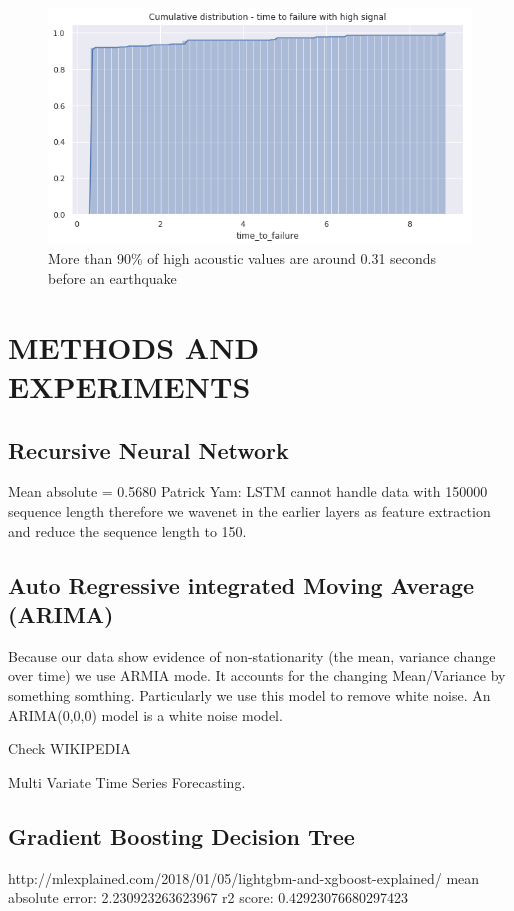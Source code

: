 \documentclass[]{llncs}
\begin{document}
\begin{figure}
	\centering
	\includegraphics[width=0.7\linewidth]{../GPUProject/moreThan90percent}
	\caption{More than 90\% of high acoustic values are around 0.31 seconds before an earthquake}
		\label{fig:morethan90percent}
	\end{figure}






\section{METHODS AND EXPERIMENTS}

\subsection{Recursive Neural Network}
Mean absolute = 0.5680
Patrick Yam: LSTM cannot handle data with 150000 sequence length therefore we wavenet in the earlier layers as feature extraction and reduce the sequence length to 150.\par

\subsection{Auto Regressive integrated Moving Average (ARIMA)}
Because our data show evidence of non-stationarity (the mean, variance change over time) we use ARMIA mode. It accounts for the changing Mean/Variance by something somthing.
Particularly we use this model to remove white noise. An ARIMA(0,0,0) model is a white noise model.

Check WIKIPEDIA

Multi Variate Time Series Forecasting.

\subsection{Gradient Boosting Decision Tree}
http://mlexplained.com/2018/01/05/lightgbm-and-xgboost-explained/
mean absolute error: 2.230923263623967
r2 score: 0.42923076680297423
\end{document}
